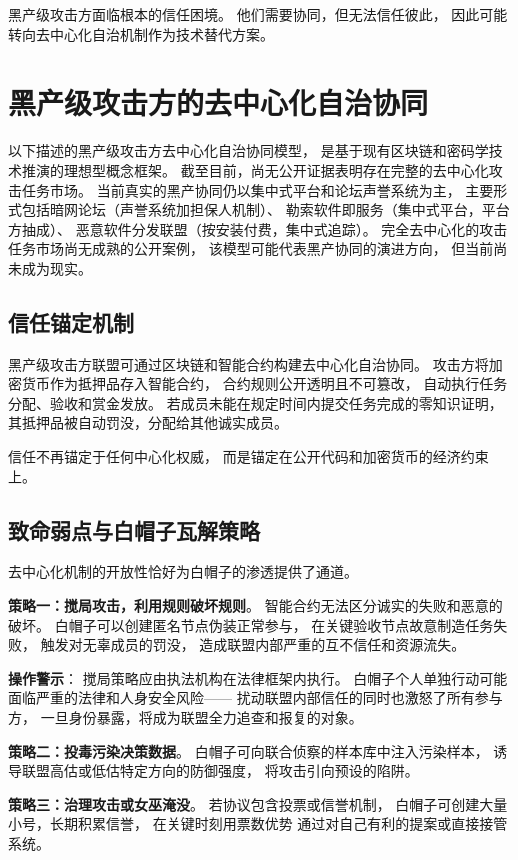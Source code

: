 \documentclass[11pt,a4paper]{article}
\begin{document}
黑产级攻击方面临根本的信任困境。
他们需要协同，但无法信任彼此，
因此可能转向去中心化自治机制作为技术替代方案。

\section{黑产级攻击方的去中心化自治协同}

以下描述的黑产级攻击方去中心化自治协同模型，
是基于现有区块链和密码学技术推演的理想型概念框架。
截至目前，尚无公开证据表明存在完整的去中心化攻击任务市场。
当前真实的黑产协同仍以集中式平台和论坛声誉系统为主，
主要形式包括暗网论坛（声誉系统加担保人机制）、
勒索软件即服务（集中式平台，平台方抽成）、
恶意软件分发联盟（按安装付费，集中式追踪）。
完全去中心化的攻击任务市场尚无成熟的公开案例，
该模型可能代表黑产协同的演进方向，
但当前尚未成为现实。

\subsection{信任锚定机制}

黑产级攻击方联盟可通过区块链和智能合约构建去中心化自治协同。
攻击方将加密货币作为抵押品存入智能合约，
合约规则公开透明且不可篡改，
自动执行任务分配、验收和赏金发放。
若成员未能在规定时间内提交任务完成的零知识证明，
其抵押品被自动罚没，分配给其他诚实成员。

信任不再锚定于任何中心化权威，
而是锚定在公开代码和加密货币的经济约束上。

\subsection{致命弱点与白帽子瓦解策略}

去中心化机制的开放性恰好为白帽子的渗透提供了通道。

\textbf{策略一：搅局攻击，利用规则破坏规则}。
智能合约无法区分诚实的失败和恶意的破坏。
白帽子可以创建匿名节点伪装正常参与，
在关键验收节点故意制造任务失败，
触发对无辜成员的罚没，
造成联盟内部严重的互不信任和资源流失。

\textbf{操作警示}：
搅局策略应由执法机构在法律框架内执行。
白帽子个人单独行动可能面临严重的法律和人身安全风险——
扰动联盟内部信任的同时也激怒了所有参与方，
一旦身份暴露，将成为联盟全力追查和报复的对象。

\textbf{策略二：投毒污染决策数据}。
白帽子可向联合侦察的样本库中注入污染样本，
诱导联盟高估或低估特定方向的防御强度，
将攻击引向预设的陷阱。

\textbf{策略三：治理攻击或女巫淹没}。
若协议包含投票或信誉机制，
白帽子可创建大量小号，长期积累信誉，
在关键时刻用票数优势
通过对自己有利的提案或直接接管系统。
\end{document}
